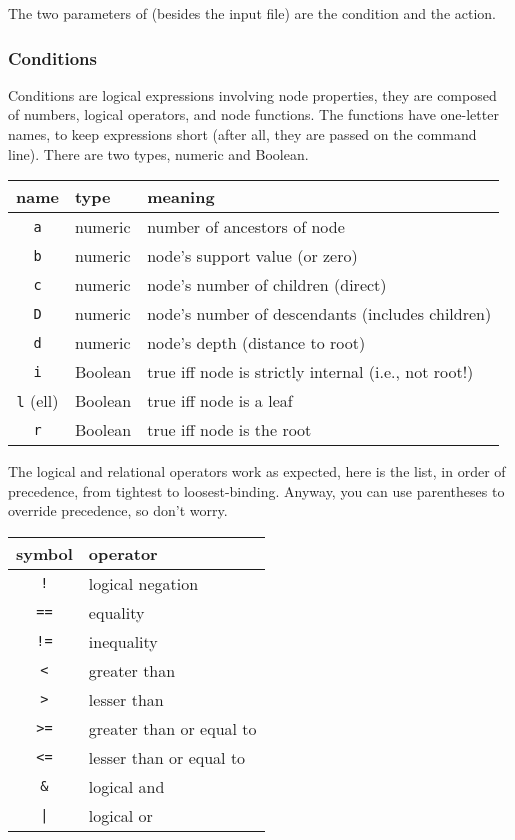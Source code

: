 The two parameters of \ed{} (besides the input file) are the
condition and the action. 

\subsubsection{Conditions}

Conditions are logical expressions involving node properties, they are composed
of numbers, logical operators, and node functions.  The functions have
one-letter names, to keep expressions short (after all, they are passed on the
command line). There are two types, numeric and Boolean.

\begin{center}
\begin{tabular}{cll}
name & type & meaning \\
\hline
\texttt{a} & numeric & number of ancestors of node	 \\
\texttt{b} & numeric & node's support value (or zero) \\
\texttt{c} & numeric & node's number of children (direct) \\
\texttt{D} & numeric & node's number of descendants (includes children) \\
\texttt{d} & numeric & node's depth (distance to root) \\
\texttt{i} & Boolean & true iff node is strictly internal (i.e., not root!) \\
\texttt{l} (ell) & Boolean & true iff node is a leaf \\
\texttt{r} & Boolean & true iff node is the root
\end{tabular}
\end{center}

The logical and relational operators work as expected, here is the list, in
order of precedence, from tightest to loosest-binding.  Anyway, you can use
parentheses to override precedence, so don't worry.

\begin{center}
\begin{tabular}{cl}
symbol & operator \\
\hline
\texttt{!} & logical negation \\
\hline
\texttt{==} & equality \\
\texttt{!=} & inequality \\
\texttt{<} & greater than \\
\texttt{>} & lesser than \\
\texttt{>=} & greater than or equal to \\
\texttt{<=} & lesser than or equal to \\
\hline
\texttt{\&} & logical and \\
\hline
\texttt{|} & logical or
\end{tabular}
\end{center}

